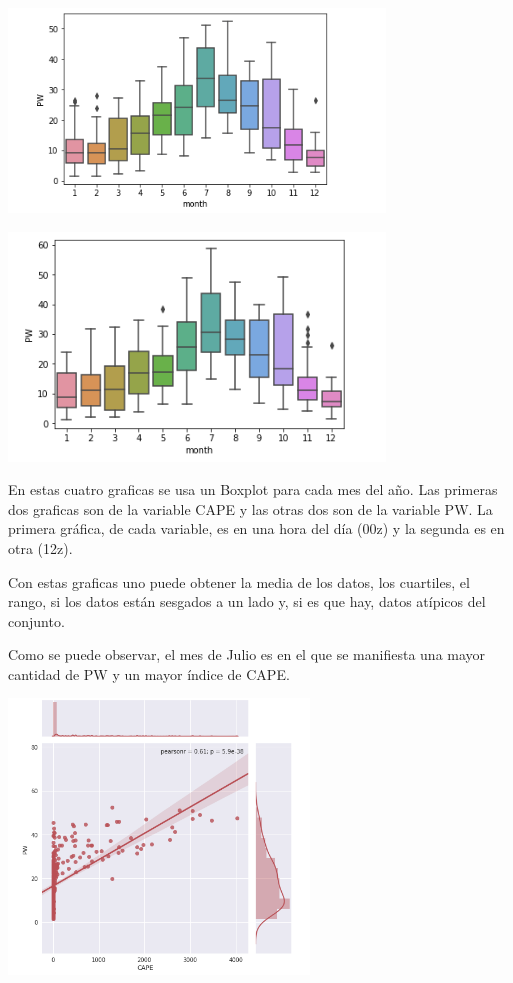 \documentclass{article}
\begin{document}
\begin{center}
	\includegraphics[width=10cm]{00zPW.png}
    
\end{center}
\vspace{0.3cm}

\begin{center}
	\includegraphics[width=10cm]{12zPW.png}
    
\end{center}
\vspace{0.3cm}

En estas cuatro graficas se usa un Boxplot para cada mes del año. Las primeras dos graficas son de la variable CAPE y las otras dos son de la variable PW. La primera gráfica, de cada variable, es en una hora del día (00z) y la segunda es en otra (12z).

Con estas graficas uno puede obtener la media de los datos, los cuartiles, el rango, si los datos están sesgados a un lado y, si es que hay, datos atípicos del conjunto.  

Como se puede observar, el mes de Julio es en el que se manifiesta una mayor cantidad de PW y un mayor índice de CAPE.

\begin{center}
	\includegraphics[width=8cm]{00zJointPlot.png}
 
\end{center}
\vspace{0.3cm}
\end{document}
